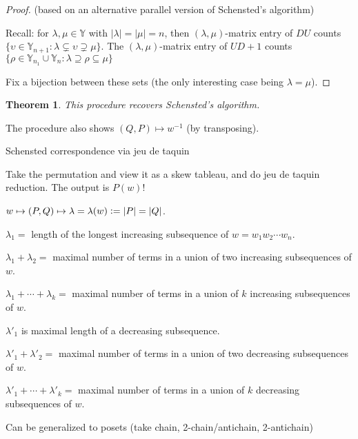 \documentclass{report}
\newcommand{\defeq}{\vcentcolon=}
\newtheorem{theorem}{Theorem}[section]
\theoremstyle{definition}
\theoremstyle{remark}
\numberwithin{equation}{section}
\begin{document}
\begin{proof}
    (based on an alternative parallel version of Schensted's algorithm)

    Recall: for $\lambda, \mu \in \mathbb Y$ with $|\lambda| = |\mu| = n$, then $(\lambda, \mu)$-matrix entry of $DU$ counts $\{\upsilon \in \mathbb Y_{n+1}: \lambda \subsetneq \upsilon \supsetneq \mu\}$. The $(\lambda, \mu)$-matrix entry of $UD + 1$ counts $\{\rho \in \mathbb Y_{n_1} \cup \mathbb Y_n: \lambda \supseteq \rho \subseteq \mu\}$

    Fix a bijection between these sets (the only interesting case being $\lambda = \mu$). 
\end{proof}

\begin{theorem}
    This procedure recovers Schensted's algorithm.
\end{theorem}
The procedure also shows $(Q, P) \mapsto w^{-1}$ (by transposing).

Schensted correspondence via jeu de taquin

Take the permutation and view it as a skew tableau, and do jeu de taquin reduction. The output is $P(w)$!

$w \mapsto (P, Q) \mapsto \lambda = \lambda(w) \defeq |P| = |Q|$.

$\lambda_1 = $ length of the longest increasing subsequence of $w = w_1 w_2 \cdots w_n$.

$\lambda_1 + \lambda_2 = $ maximal number of terms in a union of two increasing subsequences of $w$.

$\lambda_1 + \cdots + \lambda_k = $ maximal number of terms in a union of $k$ increasing subsequences of $w$.

$\lambda'_1$ is maximal length of a decreasing subsequence.

$\lambda'_1 + \lambda'_2 = $ maximal number of terms in a union of two decreasing subsequences of $w$.

$\lambda'_1 + \cdots + \lambda'_k = $ maximal number of terms in a union of $k$ decreasing subsequences of $w$.

Can be generalized to posets (take chain, 2-chain/antichain, 2-antichain)
\end{document}
